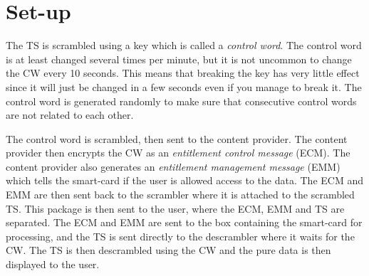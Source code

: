 \section{Set-up} \label{sec:setup}
The TS is scrambled using a key which is called a \emph{control word}. The 
control word is at least changed several times per minute, but it is not 
uncommon to change the CW every 10 seconds. This means that breaking the key 
has very little effect since it will just be changed in a few seconds even if 
you manage to break it. The control word is generated randomly to make sure 
that consecutive control words are not related to each other. 

The control word is scrambled, then sent to the content provider. The content 
provider then encrypts the CW as an \emph{entitlement control message} (ECM). 
The content provider also generates an \emph{entitlement management message} 
(EMM) which tells the smart-card if the user is allowed access to the data. The 
ECM and EMM are then sent back to the scrambler where it is attached to the 
scrambled TS. This package is then sent to the user, where the ECM, EMM and TS 
are separated. The ECM and EMM are sent to the box containing the smart-card 
for processing, and the TS is sent directly to the descrambler where it waits 
for the CW. The TS is then descrambled using the CW and the pure data is then 
displayed to the user.
